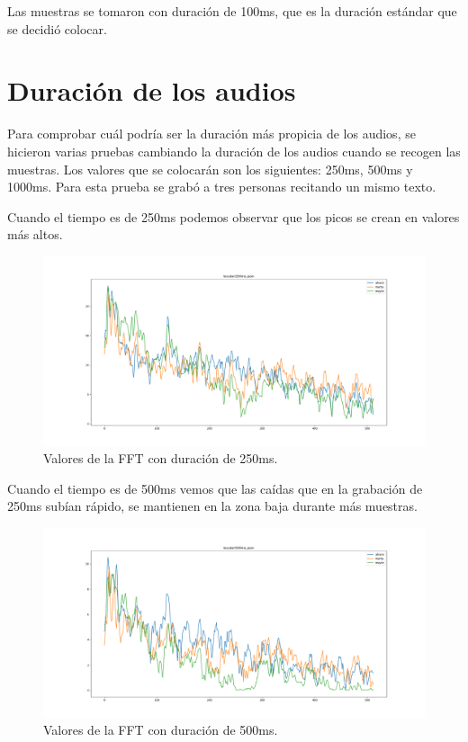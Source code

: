 \documentclass[a4paper, 12pt]{book}
\begin{document}
Las muestras se tomaron con duración de 100ms, que es la duración estándar que se decidió colocar.

\section{Duración de los audios}
\label{sec:duracion-audio}

Para comprobar cuál podría ser la duración más propicia de los audios, se hicieron varias pruebas cambiando la duración de los audios cuando se recogen las muestras. Los valores que se colocarán son los siguientes: 250ms, 500ms y 1000ms. Para esta prueba se grabó a tres personas recitando un mismo texto.

Cuando el tiempo es de 250ms podemos observar que los picos se crean en valores más altos.

\begin{figure}
	\centering
	\includegraphics[width=12cm, keepaspectratio]{img/locutor250ms.png}
	\caption{Valores de la FFT con duración de 250ms.}\label{fig:locutor250ms}
\end{figure}

Cuando el tiempo es de 500ms vemos que las caídas que en la grabación de 250ms subían rápido, se mantienen en la zona baja durante más muestras.

\begin{figure}
	\centering
	\includegraphics[width=12cm, keepaspectratio]{img/locutor500ms.png}
	\caption{Valores de la FFT con duración de 500ms.}\label{fig:locutor500ms}
\end{figure}
\end{document}
